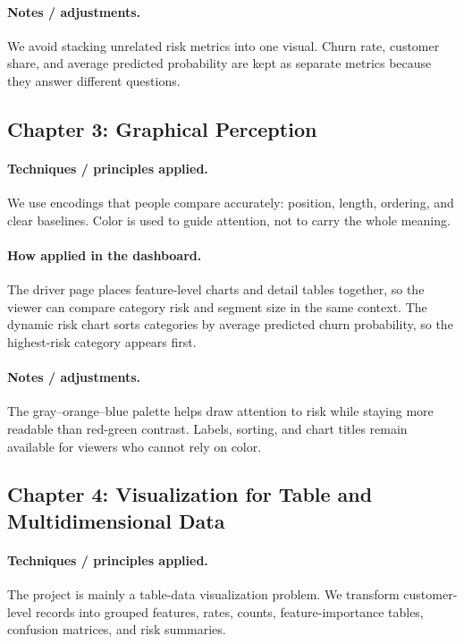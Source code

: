 \paragraph{Notes / adjustments.}
We avoid stacking unrelated risk metrics into one visual. Churn rate, customer
share, and average predicted probability are kept as separate metrics because
they answer different questions.

\subsection{Chapter 3: Graphical Perception}
\paragraph{Techniques / principles applied.}
We use encodings that people compare accurately: position, length, ordering, and
clear baselines. Color is used to guide attention, not to carry the whole
meaning.

\paragraph{How applied in the dashboard.}
The driver page places feature-level charts and detail tables together, so the
viewer can compare category risk and segment size in the same context. The
dynamic risk chart sorts categories by average predicted churn probability, so
the highest-risk category appears first.

\paragraph{Notes / adjustments.}
The gray--orange--blue palette helps draw attention to risk while staying more
readable than red-green contrast. Labels, sorting, and chart titles remain
available for viewers who cannot rely on color.

\subsection{Chapter 4: Visualization for Table and Multidimensional Data}
\paragraph{Techniques / principles applied.}
The project is mainly a table-data visualization problem. We transform
customer-level records into grouped features, rates, counts, feature-importance
tables, confusion matrices, and risk summaries.

